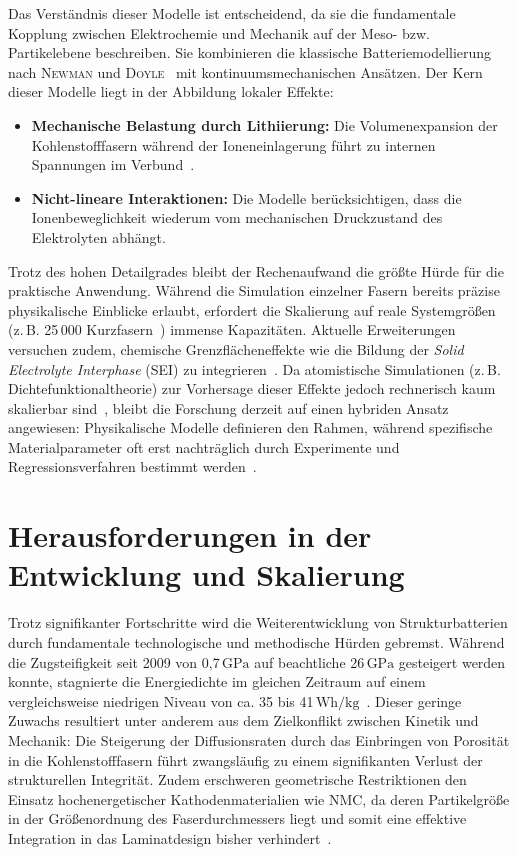 Das Verständnis dieser Modelle ist entscheidend, da sie die fundamentale Kopplung zwischen Elektrochemie und Mechanik auf der Meso- bzw. Partikelebene beschreiben. Sie kombinieren die klassische Batteriemodellierung nach \textsc{Newman} und \textsc{Doyle}~\cite{Doyle1993, Newman2021} mit kontinuumsmechanischen Ansätzen. Der Kern dieser Modelle liegt in der Abbildung lokaler Effekte:
\begin{itemize}
    \item \textbf{Mechanische Belastung durch Lithiierung:} Die Volumenexpansion der Kohlenstofffasern während der Ioneneinlagerung führt zu internen Spannungen im Verbund~\cite{Carlstedt2020b, Duan2021}.
    \item \textbf{Nicht-lineare Interaktionen:} Die Modelle berücksichtigen, dass die Ionenbeweglichkeit wiederum vom mechanischen Druckzustand des Elektrolyten abhängt.
\end{itemize}

Trotz des hohen Detailgrades bleibt der Rechenaufwand die größte Hürde für die praktische Anwendung. Während die Simulation einzelner Fasern bereits präzise physikalische Einblicke erlaubt, erfordert die Skalierung auf reale Systemgrößen (z.\,B. 25\,000 Kurzfasern~\cite{Goudarzi2022}) immense Kapazitäten. Aktuelle Erweiterungen versuchen zudem, chemische Grenzflächeneffekte wie die Bildung der \textit{Solid Electrolyte Interphase} (SEI) zu integrieren~\cite{Yuecel2024}. Da atomistische Simulationen (z.\,B. Dichtefunktionaltheorie) zur Vorhersage dieser Effekte jedoch rechnerisch kaum skalierbar sind~\cite{Franco2019, Rollin2023}, bleibt die Forschung derzeit auf einen hybriden Ansatz angewiesen: Physikalische Modelle definieren den Rahmen, während spezifische Materialparameter oft erst nachträglich durch Experimente und Regressionsverfahren bestimmt werden~\cite{Carlstedt2022, Carlstedt2023}.

\section{Herausforderungen in der Entwicklung und Skalierung}

Trotz signifikanter Fortschritte wird die Weiterentwicklung von Strukturbatterien durch fundamentale technologische und methodische Hürden gebremst. Während die Zugsteifigkeit seit 2009 von 0,7\,$\si{\GPa}$ auf beachtliche 26\,$\si{\GPa}$ gesteigert werden konnte, stagnierte die Energiedichte im gleichen Zeitraum auf einem vergleichsweise niedrigen Niveau von ca. 35 bis 41\,$\si{\watt \hour\per\kg}$~\cite{Liu2009, Siraj2023}. Dieser geringe Zuwachs resultiert unter anderem aus dem Zielkonflikt zwischen Kinetik und Mechanik: Die Steigerung der Diffusionsraten durch das Einbringen von Porosität in die Kohlenstofffasern führt zwangsläufig zu einem signifikanten Verlust der strukturellen Integrität. Zudem erschweren geometrische Restriktionen den Einsatz hochenergetischer Kathodenmaterialien wie NMC, da deren Partikelgröße in der Größenordnung des Faserdurchmessers liegt und somit eine effektive Integration in das Laminatdesign bisher verhindert~\cite{Asp2014, Asp2024}.

